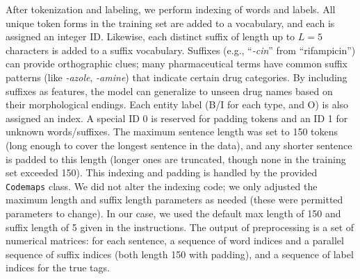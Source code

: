 After tokenization and labeling, we perform indexing of words and labels. All unique token forms in the training set are added to a vocabulary, and each is assigned an integer ID. Likewise, each distinct suffix of length up to $L=5$ characters is added to a suffix vocabulary. Suffixes (e.g., ``\textit{-cin}'' from ``rifampicin'') can provide orthographic clues; many pharmaceutical terms have common suffix patterns (like \textit{-azole}, \textit{-amine}) that indicate certain drug categories. By including suffixes as features, the model can generalize to unseen drug names based on their morphological endings. Each entity label (B/I for each type, and O) is also assigned an index. A special ID 0 is reserved for padding tokens and an ID 1 for unknown words/suffixes. The maximum sentence length was set to 150 tokens (long enough to cover the longest sentence in the data), and any shorter sentence is padded to this length (longer ones are truncated, though none in the training set exceeded 150). This indexing and padding is handled by the provided \texttt{Codemaps} class. We did not alter the indexing code; we only adjusted the maximum length and suffix length parameters as needed (these were permitted parameters to change). In our case, we used the default max length of 150 and suffix length of 5 given in the instructions. The output of preprocessing is a set of numerical matrices: for each sentence, a sequence of word indices and a parallel sequence of suffix indices (both length 150 with padding), and a sequence of label indices for the true tags. 